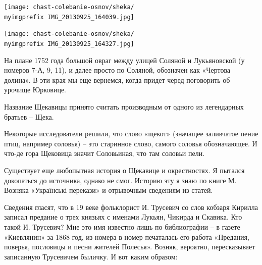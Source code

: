 \begin{center}
\texttt{[image: chast-colebanie-osnov/sheka/\\myimgprefix IMG\_20130925\_164039.jpg]}
\end{center}

\begin{center}
\texttt{[image: chast-colebanie-osnov/sheka/\\myimgprefix IMG\_20130925\_164327.jpg]}
\end{center}
 
\newpage

На плане 1752 года большой овраг между улицей Соляной и Лукьяновской (у номеров 7-А, 9, 11), и далее просто по Соляной, обозначен как «Чертова долина». В эти края мы еще вернемся, когда придет черед поговорить об урочище Юрковице.




Название Щекавицы принято считать производным от одного из легендарных братьев – Щека.

Некоторые исследователи решили, что слово «щекот» (значащее заливчатое пение птиц, например соловья) – это старинное слово, самого соловья обозначающее. И что-де гора Щековица значит Соловьиная, что там соловьи пели.

Существует еще любопытная история о Щекавице и окрестностях. Я пытался докопаться до источника, однако не смог. Историю эту я знаю по книге М. Возняка «Українські перекази» и отрывочным сведениям из статей.

Сведения гласят, что в 19 веке фольклорист И. Трусевич со слов кобзаря Кирилла записал предание о трех князьях с именами Лукьян, Чикирда и Скавика. Кто такой И. Трусевич? Мне это имя известно лишь по библиографии – в газете «Киевлянин» за 1868 год, из номера в номер печаталась его работа «Предания, поверья, пословицы и песни жителей Полесья». Возняк, вероятно, пересказывает записанную Трусевичем быличку. И вот каким образом:

